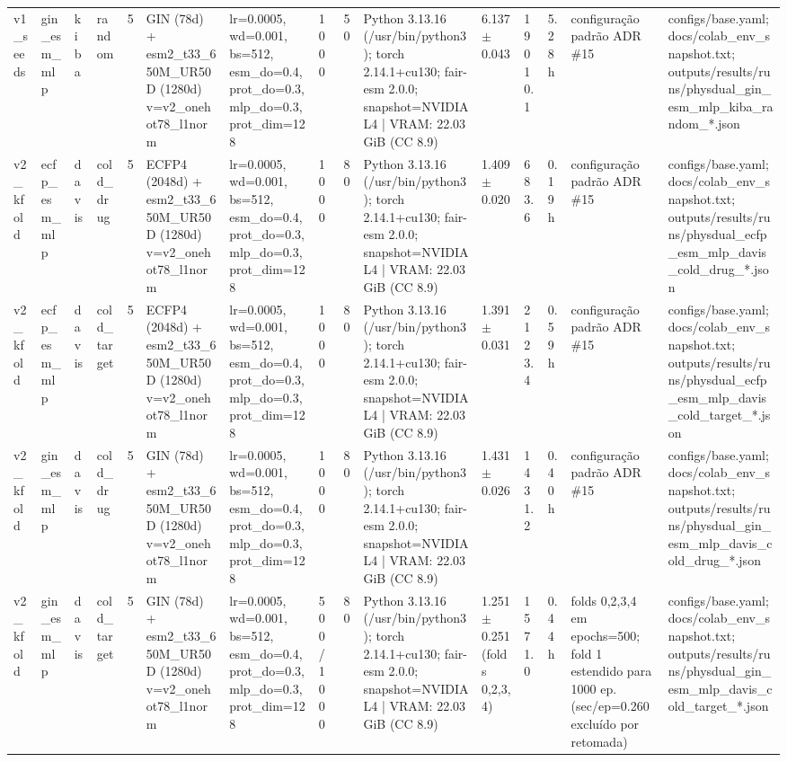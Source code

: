 \begin{table}[htbp]
\begin{tabular}{lllllllllllllll}
v1\_seeds & gin\_esm\_mlp & kiba & random & 5 & GIN (78d) + esm2\_t33\_650M\_UR50D (1280d) v=v2\_onehot78\_l1norm & lr=0.0005, wd=0.001, bs=512, esm\_do=0.4, prot\_do=0.3, mlp\_do=0.3, prot\_dim=128 & 1000 & 50 & Python 3.13.16 (/usr/bin/python3); torch 2.14.1+cu130; fair-esm 2.0.0; snapshot=NVIDIA L4 | VRAM: 22.03 GiB (CC 8.9) & 6.137 $\pm$ 0.043 & 19010.1 & 5.28 h & configuração padrão ADR \#15 & configs/base.yaml; docs/colab\_env\_snapshot.txt; outputs/results/runs/physdual\_gin\_esm\_mlp\_kiba\_random\_*.json \\
v2\_kfold & ecfp\_esm\_mlp & davis & cold\_drug & 5 & ECFP4 (2048d) + esm2\_t33\_650M\_UR50D (1280d) v=v2\_onehot78\_l1norm & lr=0.0005, wd=0.001, bs=512, esm\_do=0.4, prot\_do=0.3, mlp\_do=0.3, prot\_dim=128 & 1000 & 80 & Python 3.13.16 (/usr/bin/python3); torch 2.14.1+cu130; fair-esm 2.0.0; snapshot=NVIDIA L4 | VRAM: 22.03 GiB (CC 8.9) & 1.409 $\pm$ 0.020 & 683.6 & 0.19 h & configuração padrão ADR \#15 & configs/base.yaml; docs/colab\_env\_snapshot.txt; outputs/results/runs/physdual\_ecfp\_esm\_mlp\_davis\_cold\_drug\_*.json \\
v2\_kfold & ecfp\_esm\_mlp & davis & cold\_target & 5 & ECFP4 (2048d) + esm2\_t33\_650M\_UR50D (1280d) v=v2\_onehot78\_l1norm & lr=0.0005, wd=0.001, bs=512, esm\_do=0.4, prot\_do=0.3, mlp\_do=0.3, prot\_dim=128 & 1000 & 80 & Python 3.13.16 (/usr/bin/python3); torch 2.14.1+cu130; fair-esm 2.0.0; snapshot=NVIDIA L4 | VRAM: 22.03 GiB (CC 8.9) & 1.391 $\pm$ 0.031 & 2123.4 & 0.59 h & configuração padrão ADR \#15 & configs/base.yaml; docs/colab\_env\_snapshot.txt; outputs/results/runs/physdual\_ecfp\_esm\_mlp\_davis\_cold\_target\_*.json \\
v2\_kfold & gin\_esm\_mlp & davis & cold\_drug & 5 & GIN (78d) + esm2\_t33\_650M\_UR50D (1280d) v=v2\_onehot78\_l1norm & lr=0.0005, wd=0.001, bs=512, esm\_do=0.4, prot\_do=0.3, mlp\_do=0.3, prot\_dim=128 & 1000 & 80 & Python 3.13.16 (/usr/bin/python3); torch 2.14.1+cu130; fair-esm 2.0.0; snapshot=NVIDIA L4 | VRAM: 22.03 GiB (CC 8.9) & 1.431 $\pm$ 0.026 & 1431.2 & 0.40 h & configuração padrão ADR \#15 & configs/base.yaml; docs/colab\_env\_snapshot.txt; outputs/results/runs/physdual\_gin\_esm\_mlp\_davis\_cold\_drug\_*.json \\
v2\_kfold & gin\_esm\_mlp & davis & cold\_target & 5 & GIN (78d) + esm2\_t33\_650M\_UR50D (1280d) v=v2\_onehot78\_l1norm & lr=0.0005, wd=0.001, bs=512, esm\_do=0.4, prot\_do=0.3, mlp\_do=0.3, prot\_dim=128 & 500/1000 & 80 & Python 3.13.16 (/usr/bin/python3); torch 2.14.1+cu130; fair-esm 2.0.0; snapshot=NVIDIA L4 | VRAM: 22.03 GiB (CC 8.9) & 1.251 $\pm$ 0.251 (folds 0,2,3,4) & 1571.0 & 0.44 h & folds 0,2,3,4 em epochs=500; fold 1 estendido para 1000 ep. (sec/ep=0.260 excluído por retomada) & configs/base.yaml; docs/colab\_env\_snapshot.txt; outputs/results/runs/physdual\_gin\_esm\_mlp\_davis\_cold\_target\_*.json \\

\end{tabular}
\end{table}

